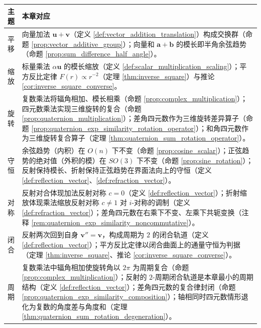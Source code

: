\begin{center}
\begin{tabular}{>{\centering\arraybackslash}p{2.2cm}>{\centering\arraybackslash}p{9.5cm}}
\toprule
主题 & 本章对应 \\
\midrule
平移 & 向量加法 $\mathbf{u}+\mathbf{v}$（定义 \ref{def:vector_addition_translation}）构成交换群（命题 \ref{prop:vector_additive_group}）；向量和 $\mathbf{a}+\mathbf{b}$ 的模长即半角余弦趋势（命题 \ref{prop:sum_difference_half_angle}）。 \\
缩放 & 标量乘法 $\alpha\mathbf{u}$ 的模长缩放（定义 \ref{def:scalar_multiplication_scaling}）；平方反比定律 $F(r)\propto r^{-2}$（定理 \ref{thm:inverse_square}）与推论 \ref{cor:inverse_square_converse}。 \\
旋转 & 复数乘法将辐角相加、模长相乘（命题 \ref{prop:complex_multiplication}）；四元数乘法实现三维旋转的复合（命题 \ref{prop:quaternion_multiplication}）；差角四元数作为三维旋转差异算子（命题 \ref{prop:quaternion_exp_similarity_rotation_operator}）；和角四元数作为三维旋转复合算子（定理 \ref{thm:quaternion_sum_rotation_operator}）。 \\
守恒 & 余弦趋势（内积）在 $O(n)$ 下不变（命题 \ref{prop:cosine_scalar}）；正弦趋势的绝对值（外积的模）在 $SO(3)$ 下不变（命题 \ref{prop:sine_rotation}）；反射保持模长、折射保持正弦趋势在界面法向上的守恒（定义 \ref{def:reflection_vector}、\ref{def:refraction_vector}）。 \\
对称 & 反射对合体现加法反射对称 $c=0$（定义 \ref{def:reflection_vector}）；折射缩放体现乘法缩放反射对称 $c\neq 1$ 对 $i$-对称的调制（定义 \ref{def:refraction_vector}）；差角四元数在右乘下不变、左乘下共轭变换（注释 \ref{rem:quaternion_exp_similarity_noncommutative}）。 \\
闭合 & 反射两次回到自身 $\mathbf{v}''=\mathbf{v}$，构成周期为 $2$ 的闭合轨道（定义 \ref{def:reflection_vector}）；平方反比定律以闭合曲面上的通量守恒为判据（定理 \ref{thm:inverse_square}、推论 \ref{cor:inverse_square_converse}）。 \\
周期 & 复数乘法中辐角相加使旋转角以 $2\pi$ 为周期复合（命题 \ref{prop:complex_multiplication}）；反射的 $2$-周期闭合轨道是本章最小的周期结构（定义 \ref{def:reflection_vector}）；差角四元数的复合律封闭（命题 \ref{prop:quaternion_exp_similarity_composition}）；轴相同时四元数情形退化为复数的角度差与角度和（定理 \ref{thm:quaternion_sum_rotation_degeneration}）。 \\
\bottomrule
\end{tabular}
\end{center}

